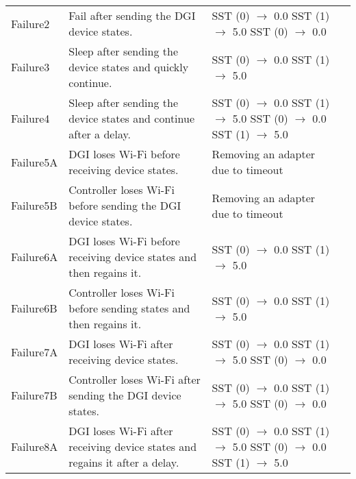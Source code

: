 \documentclass{article}
\begin{document}
\begin{center}
\begin{footnotesize}
\begin{longtable}{|p{3cm}|p{4cm}|p{10cm}|c|}
    Failure2 & Fail after sending the DGI device states. & SST (0) $\rightarrow$ 0.0 \newline SST (1) $\rightarrow$ 5.0 \newline SST (0) $\rightarrow$ 0.0 & \\
    Failure3 & Sleep after sending the device states and quickly continue. & SST (0) $\rightarrow$ 0.0 \newline SST (1) $\rightarrow$ 5.0 & \\
    Failure4 & Sleep after sending the device states and continue after a delay. & SST (0) $\rightarrow$ 0.0 \newline SST (1) $\rightarrow$ 5.0 \newline SST (0) $\rightarrow$ 0.0 \newline SST (1) $\rightarrow$ 5.0 & \\
    Failure5A & DGI loses Wi-Fi before receiving device states. & Removing an adapter due to timeout & \\
    Failure5B & Controller loses Wi-Fi before sending the DGI device states. & Removing an adapter due to timeout & \\
    Failure6A & DGI loses Wi-Fi before receiving device states and then regains it. & SST (0) $\rightarrow$ 0.0 \newline SST (1) $\rightarrow$ 5.0 & \\
    Failure6B & Controller loses Wi-Fi before sending states and then regains it. & SST (0) $\rightarrow$ 0.0 \newline SST (1) $\rightarrow$ 5.0 & \\
    Failure7A & DGI loses Wi-Fi after receiving device states. & SST (0) $\rightarrow$ 0.0 \newline SST (1) $\rightarrow$ 5.0 \newline SST (0) $\rightarrow$ 0.0 & \\
    Failure7B & Controller loses Wi-Fi after sending the DGI device states. & SST (0) $\rightarrow$ 0.0 \newline SST (1) $\rightarrow$ 5.0 \newline SST (0) $\rightarrow$ 0.0 & \\
    Failure8A & DGI loses Wi-Fi after receiving device states and regains it after a delay. & SST (0) $\rightarrow$ 0.0 \newline SST (1) $\rightarrow$ 5.0 \newline SST (0) $\rightarrow$ 0.0 \newline SST (1) $\rightarrow$ 5.0 & \\

\end{longtable}
\end{footnotesize}
\end{center}
\end{document}

